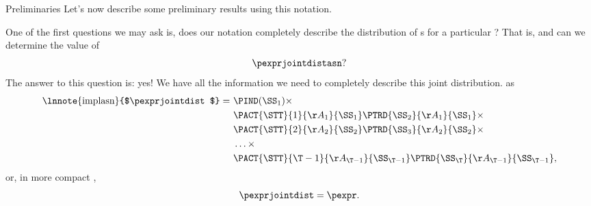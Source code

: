 \begin{part}{Preliminaries}
  Let's now describe some preliminary results using this notation.

  One of the first questions we may ask is, does our notation completely describe
  the distribution of \run{}s for a particular \str?
  That is, 
  and
  can we determine the value of
  $$\pexprjointdistasn?$$
  The answer to this question is: yes! 
  We have all the information we need 
  to completely describe 
  this joint distribution. 
   as
  \begin{align*}
    \text{\lnnote{implasn}{$\pexprjointdist$}}
    =\ &\PIND(\SS_1)\times\\
       &\PACT{\STT}{1}{\AA_1}{\SS_1}
        \PTRD{\SS_2}{\AA_1}{\SS_1}\times\\
       &\PACT{\STT}{2}{\AA_2}{\SS_2}
        \PTRD{\SS_3}{\AA_2}{\SS_2}\times\\
       &\ldots\times\\
       &\PACT{\STT}{{\T - 1}}{\AA_{\T - 1}}{\SS_{\T - 1}}
        \PTRD{\SS_\T}{\AA_{\T - 1}}{\SS_{\T - 1}},
  \end{align*}
  or, in more compact ,
  $$\pexprjointdist = \pexpr.$$
\end{part}
